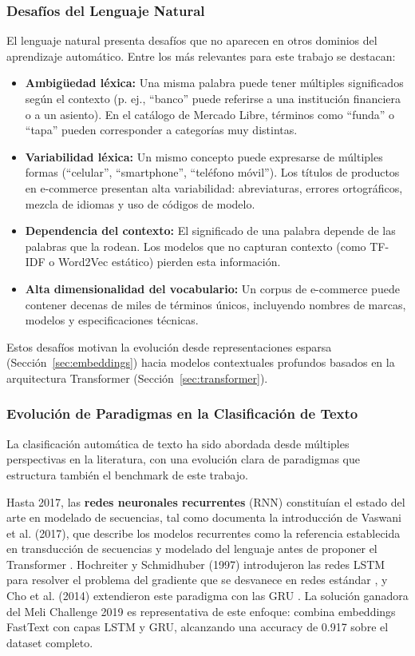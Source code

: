 \documentclass[11pt,a4paper]{article}
\begin{document}
\subsubsection{Desafíos del Lenguaje Natural}

El lenguaje natural presenta desafíos que no aparecen en otros dominios del aprendizaje automático. Entre los más relevantes para este trabajo se destacan:

\begin{itemize}
    \item \textbf{Ambigüedad léxica:} Una misma palabra puede tener múltiples significados según el contexto (p. ej., ``banco'' puede referirse a una institución financiera o a un asiento). En el catálogo de Mercado Libre, términos como ``funda'' o ``tapa'' pueden corresponder a categorías muy distintas.
    \item \textbf{Variabilidad léxica:} Un mismo concepto puede expresarse de múltiples formas (``celular'', ``smartphone'', ``teléfono móvil''). Los títulos de productos en e-commerce presentan alta variabilidad: abreviaturas, errores ortográficos, mezcla de idiomas y uso de códigos de modelo.
    \item \textbf{Dependencia del contexto:} El significado de una palabra depende de las palabras que la rodean. Los modelos que no capturan contexto (como TF-IDF o Word2Vec estático) pierden esta información.
    \item \textbf{Alta dimensionalidad del vocabulario:} Un corpus de e-commerce puede contener decenas de miles de términos únicos, incluyendo nombres de marcas, modelos y especificaciones técnicas.
\end{itemize}

Estos desafíos motivan la evolución desde representaciones esparsa (Sección~\ref{sec:embeddings}) hacia modelos contextuales profundos basados en la arquitectura Transformer (Sección~\ref{sec:transformer}).

\subsubsection{Evolución de Paradigmas en la Clasificación de Texto}

La clasificación automática de texto ha sido abordada desde múltiples perspectivas en la literatura, con una evolución clara de paradigmas que estructura también el benchmark de este trabajo.

Hasta 2017, las \textbf{redes neuronales recurrentes} (RNN) constituían el estado del arte en modelado de secuencias, tal como documenta la introducción de Vaswani et al. (2017), que describe los modelos recurrentes como la referencia establecida en transducción de secuencias y modelado del lenguaje antes de proponer el Transformer \cite{vaswani2017}. Hochreiter y Schmidhuber (1997) introdujeron las redes LSTM para resolver el problema del gradiente que se desvanece en redes estándar \cite{hochreiter1997}, y Cho et al. (2014) extendieron este paradigma con las GRU \cite{cho2014}. La solución ganadora del Meli Challenge 2019 es representativa de este enfoque: combina embeddings FastText con capas LSTM y GRU, alcanzando una accuracy de 0.917 sobre el dataset completo.
\end{document}
